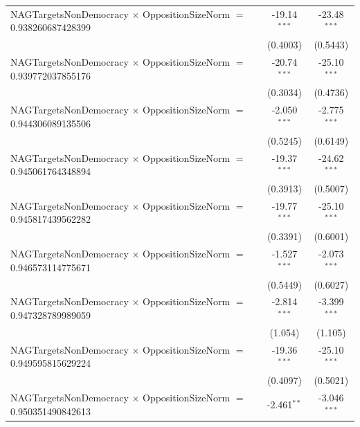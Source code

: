 \begin{tabular}{lcc}
   NAGTargetsNonDemocracy $\times$ OppositionSizeNorm $=$ 0.938260687428399     & -19.14$^{***}$       & -23.48$^{***}$\\   
                                                                                & (0.4003)             & (0.5443)\\   
   NAGTargetsNonDemocracy $\times$ OppositionSizeNorm $=$ 0.939772037855176     & -20.74$^{***}$       & -25.10$^{***}$\\   
                                                                                & (0.3034)             & (0.4736)\\   
   NAGTargetsNonDemocracy $\times$ OppositionSizeNorm $=$ 0.944306089135506     & -2.050$^{***}$       & -2.775$^{***}$\\   
                                                                                & (0.5245)             & (0.6149)\\   
   NAGTargetsNonDemocracy $\times$ OppositionSizeNorm $=$ 0.945061764348894     & -19.37$^{***}$       & -24.62$^{***}$\\   
                                                                                & (0.3913)             & (0.5007)\\   
   NAGTargetsNonDemocracy $\times$ OppositionSizeNorm $=$ 0.945817439562282     & -19.77$^{***}$       & -25.10$^{***}$\\   
                                                                                & (0.3391)             & (0.6001)\\   
   NAGTargetsNonDemocracy $\times$ OppositionSizeNorm $=$ 0.946573114775671     & -1.527$^{***}$       & -2.073$^{***}$\\   
                                                                                & (0.5449)             & (0.6027)\\   
   NAGTargetsNonDemocracy $\times$ OppositionSizeNorm $=$ 0.947328789989059     & -2.814$^{***}$       & -3.399$^{***}$\\   
                                                                                & (1.054)              & (1.105)\\   
   NAGTargetsNonDemocracy $\times$ OppositionSizeNorm $=$ 0.949595815629224     & -19.36$^{***}$       & -25.10$^{***}$\\   
                                                                                & (0.4097)             & (0.5021)\\   
   NAGTargetsNonDemocracy $\times$ OppositionSizeNorm $=$ 0.950351490842613     & -2.461$^{**}$        & -3.046$^{***}$\\   

\end{tabular}
